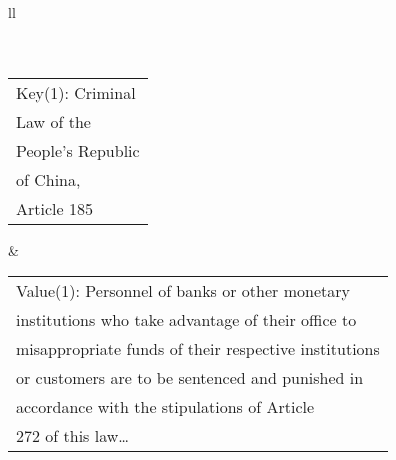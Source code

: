 \documentclass{standalone}
\begin{document}
\begin{table}[]
\begin{tabular}{ll}
\hline
{}                                                                                                                                                                                                                                                                                      \\ \hline
{}                                                                                                                                                                                                                                                                                                                                \\ \hline \hline
{}                                                                                                                                                                                                                                                                                                                                                                                                                                       \\ \hdashline
\begin{tabular}[c]{@{}l@{}}Key(1): Criminal \\ Law of the \\ People's Republic \\ of China, \\ Article 185\end{tabular} & \begin{tabular}[c]{@{}l@{}}Value(1): Personnel of banks or other monetary \\ institutions who take advantage of their office to \\ misappropriate funds of their respective institutions \\ or customers are to be sentenced and punished in \\ accordance with the stipulations of Article \\ 272 of this law…\end{tabular}                                      \\ \hdashline

\end{tabular}
\end{table}
\end{document}
